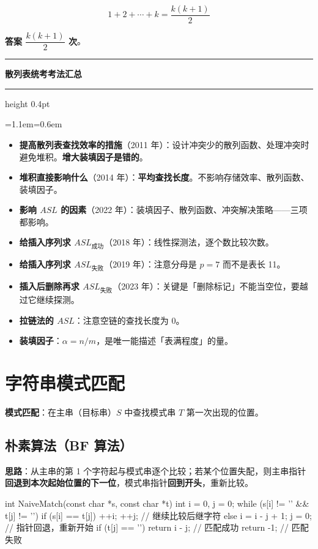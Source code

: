 \documentclass[11pt,openany,UTF8]{ctexbook}
\newcommand{\callouthead}[2]{%
  \par\addvspace{7pt}\noindent
  {\color{#1}\rule[-0.15em]{3pt}{1.05em}}\hspace{0.5em}%
  {\bfseries\color{#1}#2}\par\nobreak\vspace{-0.35em}%
  {\color{rulesep}\hrule height 0.4pt}\nobreak\vspace{0.45em}%
  \begingroup\small\setlength{\parindent}{0pt}%
  \leftskip=1.1em\rightskip=0.6em\noindent\ignorespaces}
\newcommand{\calloutend}{\par\endgroup\addvspace{7pt}}
\newenvironment{callexam}[1]{\callouthead{exambar}{#1}}{\calloutend}
\begin{document}
\[1+2+\cdots+k=\frac{k(k+1)}{2}\]

\textbf{答案 $\dfrac{k(k+1)}{2}$ 次}。

\begin{callexam}{散列表统考考法汇总}
\begin{itemize}
\item \textbf{提高散列表查找效率的措施}（2011 年）：设计冲突少的散列函数、处理冲突时避免堆积。\textbf{增大装填因子是错的}。
\item \textbf{堆积直接影响什么}（2014 年）：\textbf{平均查找长度}。不影响存储效率、散列函数、装填因子。
\item \textbf{影响 $ASL$ 的因素}（2022 年）：装填因子、散列函数、冲突解决策略——三项都影响。
\item \textbf{给插入序列求 $ASL_{成功}$}（2018 年）：线性探测法，逐个数比较次数。
\item \textbf{给插入序列求 $ASL_{失败}$}（2019 年）：注意分母是 $p=7$ 而不是表长 11。
\item \textbf{插入后删除再求 $ASL_{失败}$}（2023 年）：关键是「删除标记」不能当空位，要越过它继续探测。
\item \textbf{拉链法的 $ASL$}：注意空链的查找长度为 0。
\item \textbf{装填因子}：$\alpha=n/m$，是唯一能描述「表满程度」的量。
\end{itemize}
\end{callexam}

\section{字符串模式匹配}

\textbf{模式匹配}：在主串（目标串）$S$ 中查找模式串 $T$ 第一次出现的位置。

\subsection{朴素算法（BF 算法）}

\textbf{思路}：从主串的第 1 个字符起与模式串逐个比较；若某个位置失配，则主串指针\textbf{回退到本次起始位置的下一位}，模式串指针\textbf{回到开头}，重新比较。

\begin{codebox}
int NaiveMatch(const char *s, const char *t) {
    int i = 0, j = 0;
    while (s[i] != '\0' && t[j] != '\0') {
        if (s[i] == t[j]) { ++i; ++j; }        // 继续比较后继字符
        else { i = i - j + 1; j = 0; }         // 指针回退，重新开始
    }
    if (t[j] == '\0') return i - j;            // 匹配成功
    return -1;                                 // 匹配失败
}
\end{codebox}
\end{document}
